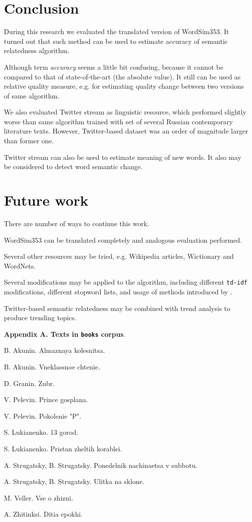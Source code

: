 \documentclass[11pt,letterpaper]{article}
\begin{document}
\section{Conclusion}

During this research we evaluated the translated version of WordSim353.
It turned out that such method can be used to estimate accuracy
of semantic relatedness algorithm. 

Although term {\em accuracy} seems a little bit confusing, because it cannot 
be compared to that of state-of-the-art (the absolute value). 
It still can be used as relative
quality measure, e.g. for estimating quality change between two versions
of same algorithm.

We also evaluated Twitter stream as linguistic resource, which performed
slightly worse than same algorithm trained with set of several Russian contemporary
literature texts. However, Twitter-based dataset was an order of magnitude larger
than former one. 

Twitter stream can also be used to estimate meaning of new words.
It also may be considered to detect word semantic change.

\section{Future work}

There are number of ways to continue this work.

WordSim353 can be translated completely and analogous evaluation performed.

Several other resources may be tried, e.g. Wikipedia articles, Wictionary and 
WordNets.

Several modifications may be applied to the algorithm, including different
{\tt td-idf} modifications, different stopword lists, and usage of methods
introduced by \cite{mikolov2013efficient}.  

Twitter-based semantic relatedness may be combined with trend analysis to
produce trending topics.




{\bf Appendix A. Texts in {\tt books} corpus}.

B. Akunin. Almaznaya kolesnitsa. 

B. Akunin. Vneklassnoe chtenie.

D. Granin. Zubr. 

V. Pelevin. Prince gosplana.

V. Pelevin. Pokolenie "P". 

S. Lukianenko. 13 gorod.

S. Lukianenko. Pristan zheltih korablei.

A. Strugatsky, B. Strugatsky. Ponedelnik nachinaetsa v subbotu.

A. Strugatsky, B. Strugatsky. Ulitka na sklone. 

M. Veller. Vse o zhizni.

A. Zhitinksi. Ditia epokhi.
\end{document}
